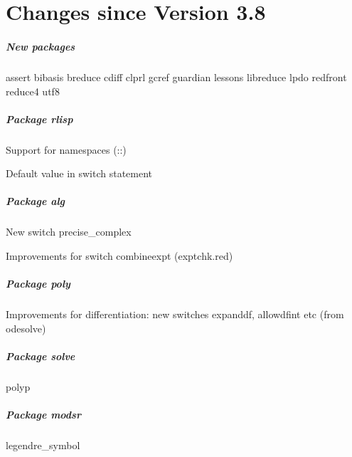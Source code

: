 \chapter{Changes since Version 3.8}

\paragraph*{New packages}

assert
bibasis
breduce
cdiff
clprl
gcref
guardian
lessons
libreduce
lpdo
redfront
reduce4
utf8

\paragraph*{Package rlisp}

Support for namespaces (::)

Default value in switch statement


\paragraph*{Package alg}

New switch precise\_complex

Improvements for switch combineexpt (exptchk.red)

\paragraph*{Package poly}

Improvements for differentiation: new switches expanddf, allowdfint etc (from odesolve)

\paragraph*{Package solve}

polyp

\paragraph*{Package modsr}

legendre\_symbol
